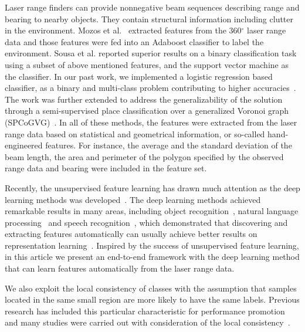 \documentclass[letterpaper, 10 pt, conference]{ieeeconf}  %
\begin{document}
Laser range finders can provide nonnegative beam sequences describing range and bearing to nearby objects. They contain structural information including clutter in the environment. Mozos et al.~\cite{mozos2005supervised} extracted features from the 360$^\circ$ laser range data and those features were fed into an Adaboost classifier to label the environment. Sousa et al. \cite{sousa2007real} reported superior results on a binary classification task using a subset of above mentioned features, and the support vector machine as the classifier. In our past work, we implemented a logistic regression based classifier, as a binary and multi-class problem contributing to higher accuracies~\cite{shi2010laser,shi2010multi}. The work was further extended to address the generalizability of the solution through a semi-supervised place classification over a generalized Voronoi graph (SPCoGVG)~\cite{shi2013towards}. In all of these methods, the features were extracted from the laser range data based on statistical and geometrical information, or so-called hand-engineered features. For instance, the average and the standard deviation of the beam length, the area and perimeter of the polygon specified by the observed range data and bearing were included in the feature set.

Recently, the unsupervised feature learning has drawn much attention as the deep learning methods was developed~\cite{HinSal06,Hinton2006,Bengio2007}. The deep learning methods achieved remarkable results in many areas, including object recognition~\cite{boureau2011ask,le2013building}, natural language processing~\cite{collobert2011natural,glorot2011domain} and speech recognition~\cite{dahl2012context}, which demonstrated that discovering and extracting features automatically can usually achieve better results on representation learning~\cite{citeulike:9426230,Rifai:2011:HOC:2034117.2034159,Vincent:2011:CSM:2000609.2000610}. Inspired by the success of unsupervised feature learning, in this article we present an end-to-end framework with the deep learning method that can learn features automatically from the laser range data.

We also exploit the local consistency of classes with the assumption that samples located in the same small region are more likely to have the same labels. Previous research has included this particular characteristic for performance promotion and many studies were carried out with consideration of the local consistency~\cite{ranganathan2011visual,pronobis2012large,mozos2005supervised,martinez2007supervised,ranganathan2010pliss}.
\end{document}
